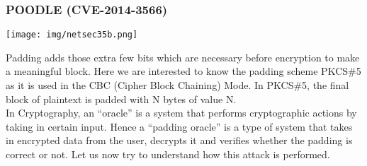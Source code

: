 \documentclass[a4paper, 10pt, titlepage]{article}
\begin{document}
\subsubsection{POODLE (CVE-2014-3566)}
\begin{center}
	\texttt{[image: img/netsec35b.png]}
\end{center}
Padding adds those extra few bits which are necessary before encryption to make a meaningful block. Here we are interested to know the padding scheme PKCS\#5 as it is used in the CBC (Cipher Block Chaining) Mode.
In PKCS\#5, the final block of plaintext is padded with N
bytes of value N. \\
In Cryptography, an “oracle” is a system that performs cryptographic actions by taking in certain input. Hence a “padding oracle” is a type of system that takes in encrypted data from the user, decrypts it and verifies whether the padding is correct or not. Let us now try to understand how this attack is performed.
\end{document}
